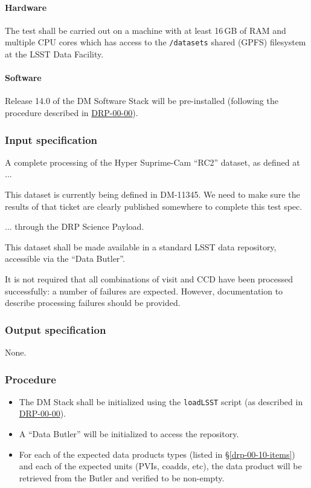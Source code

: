 \paragraph{Hardware}

The test shall be carried out on a machine with at least 16\,GB of RAM and
multiple CPU cores which has access to the \texttt{/datasets} shared (GPFS)
filesystem at the LSST Data Facility.

\paragraph{Software}

Release 14.0 of the DM Software Stack will be pre-installed (following the
procedure described in \hyperref[drp-00-00]{DRP-00-00}).

\subsubsection{Input specification}

A complete processing of the Hyper Suprime-Cam ``RC2'' dataset, as defined
at ...

\begin{note}
This dataset is currently being defined in DM-11345. We need to make sure the
results of that ticket are clearly published somewhere to complete this test
spec.

\end{note}

... through the DRP Science Payload.

This dataset shall be made available in a standard LSST data repository,
accessible via the ``Data Butler''.

It is not required that all combinations of visit and CCD have been processed
successfully: a number of failures are expected. However, documentation to
describe processing failures should be provided.

\subsubsection{Output specification}

None.

\subsubsection{Procedure}

\begin{itemize}

  \item{The DM Stack shall be initialized using the \texttt{loadLSST} script
  (as described in \hyperref[drp-00-00]{DRP-00-00}).}

  \item{A ``Data Butler'' will be initialized to access the repository.}

  \item{For each of the expected data products types (listed in \S\ref{drp-00-10-items})
  and each of the expected units (PVIs, coadds, etc), the data product will be
  retrieved from the Butler and verified to be non-empty.}

\end{itemize}
